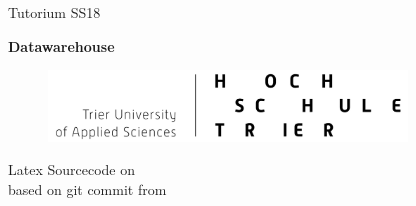 \begin{titlepage}
  \begin{center}
    \begin{large}
      Tutorium SS18
    \end{large}
    
    \begin{huge}
      \begin{singlespace}
            \textbf{Datawarehouse}
      \end{singlespace}
    \end{huge}

    \vspace{0.5cm}

    \begin{figure}[h]
      \centering
      \includegraphics[width=0.85\textwidth]{img//logo.png}
      \label{img:fh-trier-logo}
    \end{figure}

    \vspace{2cm}
    
    Latex Sourcecode on  \\
    based on git commit  from 
    
    
  \end{center}
\end{titlepage}
